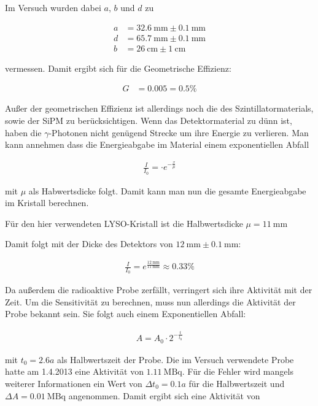 \documentclass[12pt,twoside,a4paper]{scrartcl}
\begin{document}
			Im Versuch wurden dabei $a$, $b$ und $d$ zu

			\begin{align*}
					a &= \SI{32.6}{\milli \metre} \pm \SI{0.1}{\milli \metre} \\
					d &= \SI{65.7}{\milli \metre} \pm \SI{0.1}{\milli \metre}\\
					b &= \SI{26}{\centi \metre}\pm \SI{1}{\centi \metre}
			\end{align*}

			vermessen. Damit ergibt sich für die Geometrische Effizienz:

			\begin{align*}
				G &= 0.005 = 0.5 \%
			\end{align*}

			Außer der geometrischen Effizienz ist allerdings noch die des Szintillatormaterials, sowie der SiPM zu berücksichtigen. Wenn das Detektormaterial zu dünn ist, haben die $\gamma$-Photonen nicht genügend Strecke um ihre Energie zu verlieren. Man kann annehmen dass die Energieabgabe im Material einem exponentiellen Abfall

			\begin{align*}
				\frac{I}{I_0} =  \cdot e^{-\frac{x}{\mu}}
			\end{align*}

			mit $\mu$ als Habwertsdicke folgt. Damit kann man nun die gesamte Energieabgabe im Kristall berechnen.

			Für den hier verwendeten LYSO-Kristall ist die Halbwertsdicke $\mu = \SI{11}{\milli \metre}$

			Damit folgt mit der Dicke des Detektors von $\SI{12}{\milli \metre} \pm \SI{0.1}{\milli \metre}$:

			\begin{align*}
				\frac{I}{I_0} = e^{\frac{\SI{12}{\milli \metre}}{\SI{11}{\milli \metre}}} \approx 0.33 \%
			\end{align*}


			Da außerdem die radioaktive Probe zerfällt, verringert sich ihre Aktivität mit der Zeit. Um die Sensitivität zu berechnen, muss nun allerdings die Aktivität der Probe bekannt sein. Sie folgt auch einem Exponentiellen Abfall:

			\begin{align*}
				A = A_0 \cdot 2^{- \frac{t}{t_0}}
			\end{align*}

			mit $t_0 = 2.6 a$ als Halbwertszeit der Probe. Die im Versuch verwendete Probe hatte am 1.4.2013 eine Aktivität von $\SI{1.11}{\mega \becquerel}$.
			Für die Fehler wird mangels weiterer Informationen ein Wert von $\Delta t_0 = 0.1 a$ für die Halbwertszeit und $\Delta A = \SI{0.01}{\mega \becquerel}$ angenommen.
			Damit ergibt sich eine Aktivität von
\end{document}
